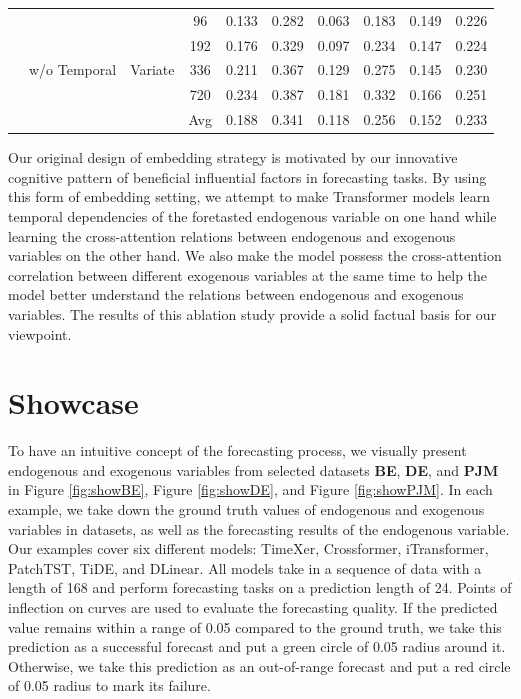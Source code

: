 \documentclass[nohyperref]{article}
\theoremstyle{plain}
\theoremstyle{definition}
\theoremstyle{remark}
\begin{document}
\begin{table}[h]
\begin{sc}
{\begin{tabular}{c|c|c|c|cc|cc|cc}
 \cmidrule(lr){2-10}
 & \multirow{5}{*}{w/o Temporal} & \multirow{5}{*}{Variate} & 96 & 0.133 & 0.282 & 0.063 & 0.183 & 0.149 & 0.226 \\ 
 &  &  & 192 & 0.176 & 0.329 & 0.097 & 0.234 & 0.147 & 0.224 \\
 &  &  & 336 & 0.211 & 0.367 & 0.129 & 0.275 & 0.145 & 0.230 \\
 &  &  & 720 & 0.234 & 0.387 & 0.181 & 0.332 & 0.166 & 0.251 \\
 &  &  & Avg & 0.188 & 0.341 & 0.118 & 0.256 & 0.152 & 0.233 
 \\ \bottomrule[1.2pt]
\end{tabular}}
\end{sc}
\end{table}

Our original design of embedding strategy is motivated by our innovative cognitive pattern of beneficial influential factors in forecasting tasks. By using this form of embedding setting, we attempt to make Transformer models learn temporal dependencies of the foretasted endogenous variable on one hand while learning the cross-attention relations between endogenous and exogenous variables on the other hand. We also make the model possess the cross-attention correlation between different exogenous variables at the same time to help the model better understand the relations between endogenous and exogenous variables. The results of this ablation study provide a solid factual basis for our viewpoint. 




\section{Showcase}
To have an intuitive concept of the forecasting process, we visually present endogenous and exogenous variables from selected datasets \textbf{BE}, \textbf{DE}, and \textbf{PJM} in Figure \ref{fig:showBE}, Figure \ref{fig:showDE}, and Figure \ref{fig:showPJM}. In each example, we take down the ground truth values of endogenous and exogenous variables in datasets, as well as the forecasting results of the endogenous variable. Our examples cover six different models: TimeXer, Crossformer, iTransformer, PatchTST, TiDE, and DLinear. All models take in a sequence of data with a length of 168 and perform forecasting tasks on a prediction length of 24. Points of inflection on curves are used to evaluate the forecasting quality. If the predicted value remains within a range of 0.05 compared to the ground truth, we take this prediction as a successful forecast and put a green circle of 0.05 radius around it. Otherwise, we take this prediction as an out-of-range forecast and put a red circle of 0.05 radius to mark its failure.
\end{document}
